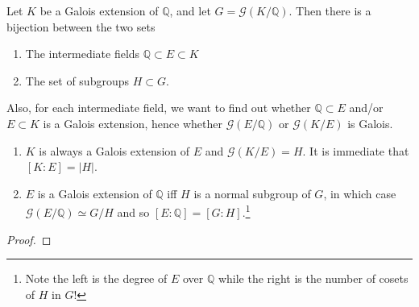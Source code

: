   \begin{figure}[H]
    \centering
    \begin{subfigure}[b]{0.4\textwidth}
      \centering
      \caption{}
    \end{subfigure}
    \hfill 
    \begin{subfigure}[b]{0.58\textwidth}
      \centering
      \caption{}
    \end{subfigure}
    \caption{}
  \end{figure}

  \begin{theorem}
    Let $K$ be a Galois extension of $\mathbb{Q}$, and let $G = \mathcal{G}(K/\mathbb{Q})$. Then there is a bijection between the two sets
    \begin{enumerate}
      \item The intermediate fields $\mathbb{Q} \subset E \subset K$
      \item The set of subgroups $H \subset G$. 
    \end{enumerate} 
    Also, for each intermediate field, we want to find out whether $\mathbb{Q} \subset E$ and/or $E \subset K$ is a Galois extension, hence whether $\mathcal{G}(E/\mathbb{Q})$ or $\mathcal{G}(K/E)$ is Galois. 
    \begin{enumerate}
      \item $K$ is always a Galois extension of $E$ and $\mathcal{G}(K/E) = H$. It is immediate that $[K:E] = |H|$. 
      \item $E$ is a Galois extension of $\mathbb{Q}$ iff $H$ is a normal subgroup of $G$, in which case $\mathcal{G}(E/\mathbb{Q}) \simeq G/H$ and so $[E:\mathbb{Q}] = [G:H]$.\footnote{Note the left is the degree of $E$ over $\mathbb{Q}$ while the right is the number of cosets of $H$ in $G$!} 
    \end{enumerate}
  \end{theorem}
  \begin{proof}
    
  \end{proof}

